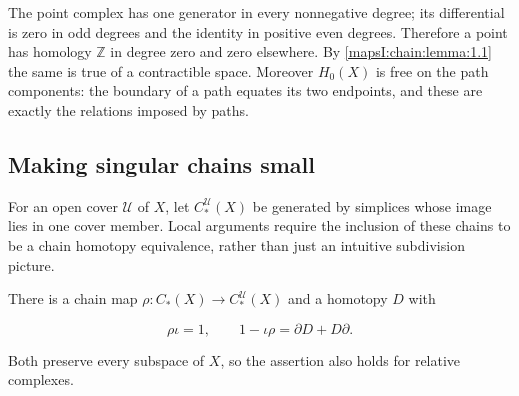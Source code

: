 The point complex has one generator in every nonnegative degree; its differential is zero in odd degrees and the identity in positive even degrees. Therefore a point has homology \(\mathbb Z\) in degree zero and zero elsewhere. By \cref{mapsI:chain:lemma:1.1} the same is true of a contractible space. Moreover \(H_0(X)\) is free on the path components: the boundary of a path equates its two endpoints, and these are exactly the relations imposed by paths.

\subsection{Making singular chains small}
\label{mapsI:chain:section-2}

For an open cover \(\mathcal U\) of \(X\), let \(C_*^{\mathcal U}(X)\) be generated by simplices whose image lies in one cover member. Local arguments require the inclusion of these chains to be a chain homotopy equivalence, rather than just an intuitive subdivision picture.

\begin{lemma}
\label{mapsI:chain:lemma:2.1}
There is a chain map \(\rho:C_*(X)\to C_*^{\mathcal U}(X)\) and a homotopy \(D\) with

\[
\rho\iota=1,\qquad 1-\iota\rho=\partial D+D\partial.
\]

Both preserve every subspace of \(X\), so the assertion also holds for relative complexes.
\end{lemma}

